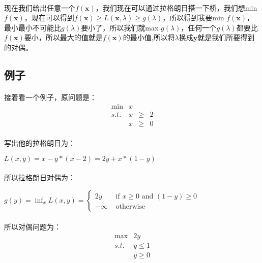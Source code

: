	\paragraph{}现在我们给出任意一个$f(\bm{x})$，我们现在可以通过拉格朗日搭一下桥，我们想min $f(\bm{x})$，现在可以得到$f(\bm{x}) \geq L(\bm{x},\lambda) \geq g(\lambda)$，所以得到我要min $f(\bm{x})$，最小最小不可能比$g(\lambda)$要小了，所以我们就max $g(\lambda)$，任何一个$g(\lambda)$都要比$f(\bm{x})$要小，所以最大的值就是$f(\bm{x})$的最小值,所以将$\lambda$换成$\bm{y}$就是我们所要得到的对偶。
	\subsection{例子}
	\paragraph{}接着看一个例子，原问题是：
		\[
		\begin{array}{rrrrrrrrl}
 			\min & x & &   \\
 			s.t. & x & \geq& 2 \\ 
      			 & x & \geq& 0 
		\end{array} \nonumber
		\]
	\paragraph{}写出他的拉格朗日为：
	\begin{center}
		$L(x,y) = x - y*(x-2 ) = 2y + x*(1-y)$ 
	\end{center}
	\paragraph{}所以拉格朗日对偶为：
	\begin{center}
		$g(y) = \inf_x L(x,y) =  \begin{cases} 2 y & \text{ if } x\geq 0 \text{ and } (1-y)\geq 0  \\ 
                                                          -\infty & \text{ otherwise } 
                                     \end{cases} $
	\end{center}
	\paragraph{}所以对偶问题为：
	\[
	\begin{array}{rrrrrrrrl}
 		\max & 2y    \\
 		s.t. & y  \leq 1 \\ 
      		 & y  \geq 0 
	\end{array} \nonumber
	\]
